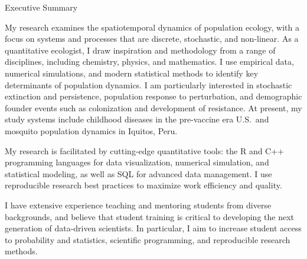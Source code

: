\documentclass{resume} %
\begin{document}


\begin{rSection}{Executive Summary}
\item 
My research examines the spatiotemporal dynamics of population ecology, 
with a focus on systems and processes that are discrete, stochastic,
and non-linear. As a quantitative ecologist, I draw 
inspiration and methodology from a range of disciplines, including 
chemistry, physics, and mathematics.
I use empirical data, numerical simulations, and modern statistical methods to
identify key determinants of population dynamics.  I am particularly interested
in stochastic extinction and persistence, population response to
perturbation, and demographic founder events such
as colonization and development of resistance. At present, my study systems 
include childhood diseases in the pre-vaccine era U.S.\, and mosquito population 
dynamics in Iquitos, Peru.

\item My research is facilitated by cutting-edge quantitative tools:
the R and C++ programming languages for data visualization,
numerical simulation, and statistical modeling, as well as SQL for 
advanced data management. I use reproducible research best practices 
to maximize work efficiency and quality.

\item I have extensive experience teaching and mentoring students from diverse
backgrounds, and believe that student training is critical to developing the
next generation of data-driven scientists.  In particular, I aim to increase
student access to probability and statistics, scientific programming,
and reproducible research methods.

\end{rSection}
\end{document}
